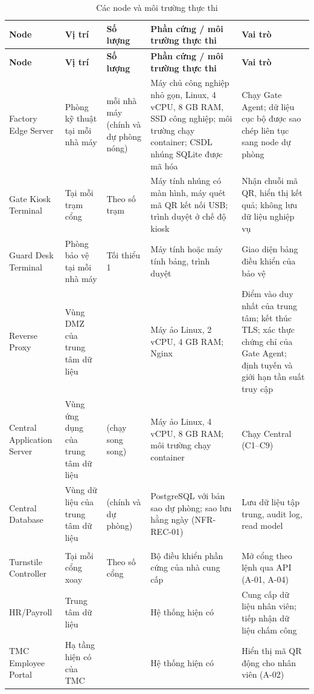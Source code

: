 \begingroup
\small
\renewcommand{\arraystretch}{1.3}
\begin{longtable}{|>{\raggedright\arraybackslash}p{2.8cm}|>{\raggedright\arraybackslash}p{2.4cm}|>{\raggedright\arraybackslash}p{1.6cm}|>{\raggedright\arraybackslash}p{4.2cm}|>{\raggedright\arraybackslash}p{4.0cm}|}
\caption{Các node và môi trường thực thi}\label{tab:nodes}\\
\hline
\textbf{Node} & \textbf{Vị trí} & \textbf{Số lượng} & \textbf{Phần cứng / môi trường thực thi} & \textbf{Vai trò} \\
\hline
\endfirsthead
\hline
\textbf{Node} & \textbf{Vị trí} & \textbf{Số lượng} & \textbf{Phần cứng / môi trường thực thi} & \textbf{Vai trò} \\
\hline
\endhead
\hline
\endfoot
\endlastfoot
Factory Edge Server & Phòng kỹ thuật tại mỗi nhà máy & 2 mỗi nhà máy (chính và dự phòng nóng) & Máy chủ công nghiệp nhỏ gọn, Linux, 4 vCPU, 8 GB RAM, SSD công nghiệp; môi trường chạy container; CSDL nhúng SQLite được mã hóa & Chạy Gate Agent; dữ liệu cục bộ được sao chép liên tục sang node dự phòng \\
\hline
Gate Kiosk Terminal & Tại mỗi trạm cổng & Theo số trạm & Máy tính nhúng có màn hình, máy quét mã QR kết nối USB; trình duyệt ở chế độ kiosk & Nhận chuỗi mã QR, hiển thị kết quả; không lưu dữ liệu nghiệp vụ \\
\hline
Guard Desk Terminal & Phòng bảo vệ tại mỗi nhà máy & Tối thiểu 1 & Máy tính hoặc máy tính bảng, trình duyệt & Giao diện bảng điều khiển của bảo vệ \\
\hline
Reverse Proxy & Vùng DMZ của trung tâm dữ liệu & 1 & Máy ảo Linux, 2 vCPU, 4 GB RAM; Nginx & Điểm vào duy nhất của trung tâm; kết thúc TLS; xác thực chứng chỉ của Gate Agent; định tuyến và giới hạn tần suất truy cập \\
\hline
Central Application Server & Vùng ứng dụng của trung tâm dữ liệu & 2 (chạy song song) & Máy ảo Linux, 4 vCPU, 8 GB RAM; môi trường chạy container & Chạy Central (C1--C9) \\
\hline
Central Database & Vùng dữ liệu của trung tâm dữ liệu & 2 (chính và dự phòng) & PostgreSQL với bản sao dự phòng; sao lưu hằng ngày (NFR-REC-01) & Lưu dữ liệu tập trung, audit log, read model \\
\hline
\multicolumn{5}{|l|}{\textit{Hệ thống bên ngoài}} \\
\hline
Turnstile Controller & Tại mỗi cổng xoay & Theo số cổng & Bộ điều khiển phần cứng của nhà cung cấp & Mở cổng theo lệnh qua API (A-01, A-04) \\
\hline
HR/Payroll & Trung tâm dữ liệu & 1 & Hệ thống hiện có & Cung cấp dữ liệu nhân viên; tiếp nhận dữ liệu chấm công \\
\hline
TMC Employee Portal & Hạ tầng hiện có của TMC & 1 & Hệ thống hiện có & Hiển thị mã QR động cho nhân viên (A-02) \\
\hline
\end{longtable}
\endgroup


